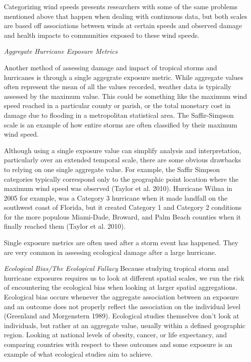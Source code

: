 \documentclass[]{article}
\begin{document}
Categorizing wind speeds presents researchers with some of the same
problems mentioned above that happen when dealing with continuous data,
but both scales are based off associations between winds at certain
speeds and observed damage and health impacts to communities exposed to
these wind speeds.

\emph{Aggregate Hurricane Exposure Metrics}

Another method of assessing damage and impact of tropical storms and
hurricanes is through a single aggegrate exposure metric. While
aggregate values often represent the mean of all the values recorded,
weather data is typically assessed by the maximum value. This could be
something like the maximum wind speed reached in a particular county or
parish, or the total monetary cost in damage due to flooding in a
metropolitan statistical area. The Saffir-Simpson scale is an example of
how entire storms are often classified by their maximum wind speed.

Although using a single exposure value can simplify analysis and
interpretation, particularly over an extended temporal scale, there are
some obvious drawbacks to relying on one single aggregate value. For
example, the Saffir Simpson categories typically correspond only to the
geographic point location where the maximum wind speed was observed
(Taylor et al. 2010). Hurricane Wilma in 2005 for example, was a
Category 3 hurricane when it made landfall on the southwest coast of
Florida, but it created Category 1 and Category 2 conditions for the
more populous Miami-Dade, Broward, and Palm Beach counties when it
finally reached them (Taylor et al. 2010).

Single exposure metrics are often used after a storm event has happened.
They are very common in assessing ecological damage after a large
hurricane.

\emph{Ecological Bias/The Ecological Fallacy} Because studying tropical
storm and hurricane exposures requires us to look at different spatial
scales, we run the risk of encountering the ecological bias when looking
at larger spatial aggregations. Ecological bias occurs whenever the
aggregate association between an exposure and an outcome does not
properly reflect the association on the individual level (Greenland and
Morgenstern 1989). Ecological studies themselves don't look at
individuals, but rather at an aggregate value, usually within a defined
geographic region. Looking at national levels of obesity, cancer, or
life expectancy, and comparing countries with respect to these outcomes
and some exposure is an example of what ecological studies aim to
achieve.
\end{document}
